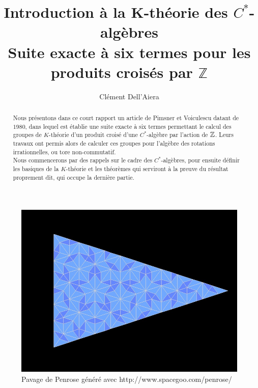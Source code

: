 \documentclass[a4paper]{article}
\title{Introduction à la K-théorie des $C^*$-algèbres\\ Suite exacte à six termes pour les produits croisés par $\mathbb Z$}
\date{}
\author{ Clément Dell'Aiera}
\begin{document}
\maketitle
\begin{figure}[h]\centering
\includegraphics[scale=0.4]{Penrose.png}
\caption{Pavage de Penrose généré avec http://www.spacegoo.com/penrose/}
\label{fig:Penrose}
\end{figure}

\newpage
\begin{abstract}
Nous présentons dans ce court rapport un article de Pimsner et Voiculescu datant de $1980$, dans lequel est établie une suite exacte à six termes permettant le calcul des groupes de $K$-théorie d'un produit croisé d'une $C^*$-algèbre par l'action de $\mathbb Z$. Leurs travaux ont permis alors de calculer ces groupes pour l'algèbre des rotations irrationnelles, ou tore non-commutatif.\\
Nous commencerons par des rappels sur le cadre des $C^*$-algèbres, pour ensuite définir les basiques de la $K$-théorie et les théorèmes qui serviront à la preuve du résultat proprement dit, qui occupe la dernière partie. 
\end{abstract}
\tableofcontents

\newpage







%

%


 
\nocite{*}
\end{document}
